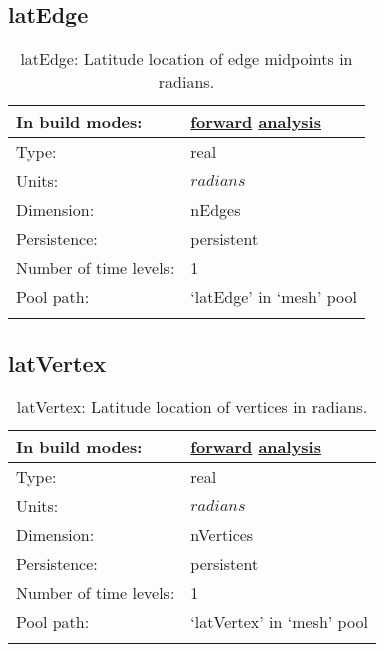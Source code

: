 \subsection[latEdge]{latEdge}
\label{subsec:var_sec_mesh_latEdge}
\begin{center}
\begin{longtable}{| p{2.0in} | p{4.0in} |}
        \hline 
        In build modes: & \hyperref[subsec:forward_var_tab_mesh]{forward} \hyperref[subsec:analysis_var_tab_mesh]{analysis} \\
        \hline 
        Type: & real \\
        \hline 
        Units: & $radians$ \\
        \hline 
        Dimension: & nEdges \\
        \hline 
        Persistence: & persistent \\
        \hline 
        Number of time levels: & 1 \\
        \hline 
            Pool path: & `latEdge' in `mesh' pool \\
		 \hline 
    \caption{latEdge: Latitude location of edge midpoints in radians.}
\end{longtable}
\end{center}
\subsection[latVertex]{latVertex}
\label{subsec:var_sec_mesh_latVertex}
\begin{center}
\begin{longtable}{| p{2.0in} | p{4.0in} |}
        \hline 
        In build modes: & \hyperref[subsec:forward_var_tab_mesh]{forward} \hyperref[subsec:analysis_var_tab_mesh]{analysis} \\
        \hline 
        Type: & real \\
        \hline 
        Units: & $radians$ \\
        \hline 
        Dimension: & nVertices \\
        \hline 
        Persistence: & persistent \\
        \hline 
        Number of time levels: & 1 \\
        \hline 
            Pool path: & `latVertex' in `mesh' pool \\
		 \hline 
    \caption{latVertex: Latitude location of vertices in radians.}
\end{longtable}
\end{center}

